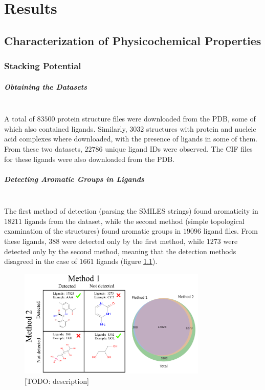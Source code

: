 \chapter{Results} %

\section{Characterization of Physicochemical Properties}
  \subsection{Stacking Potential}
    \paragraph*{Obtaining the Datasets}\mbox{}\\
      A total of $83500$ protein structure files were downloaded from the PDB, some of which also contained ligands. Similarly, $3032$ structures with protein and nucleic acid complexes where downloaded, with the presence of ligands in some of them. From these two datasets, $22786$ unique ligand IDs were observed. The CIF files for these ligands were also downloaded from the PDB.

    \paragraph*{Detecting Aromatic Groups in Ligands}\mbox{}\\
      The first method of detection (parsing the SMILES strings) found aromaticity in $18211$ ligands from the dataset, while the second method (simple topological examination of the structures) found aromatic groups in $19096$ ligand files. From these ligands, $388$ were detected only by the first method, while $1273$ were detected only by the second method, meaning that the detection methods disagreed in the case of $1661$ ligands (figure \ref{fig:results/stacking}).

      \begin{figure}[H]
        \centering
        \includegraphics[width=0.8\textwidth]{figures/results/stacking.png}
        \caption{\label{fig:results/stacking} [TODO: description]}
      \end{figure}

